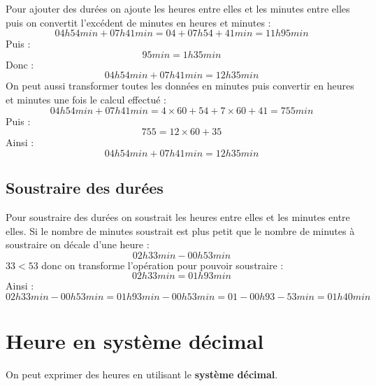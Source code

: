 \begin{pageCours}
\begin{Mt}
Pour ajouter des durées on ajoute les heures entre elles et les minutes entre elles puis on convertit l'excédent de minutes en heures et minutes :
\[04h54min+07h41min=04+07h54+41min=11h95min\]
Puis :
\[95min=1h35min\]
Donc :
\[04h54min+07h41min=12h35min\]
On peut aussi transformer toutes les données en minutes puis convertir en heures et minutes une fois le calcul effectué :
\[04h54min+07h41min=4\times60+54+7\times60+41
=755min\]
Puis :
\[755=12\times60+35\]
Ainsi :
\[04h54min+07h41min=12h35min\]
\end{Mt}



\subsection{Soustraire des durées}

\begin{Mt}
Pour soustraire des durées on soustrait les heures entre elles et les minutes entre elles. Si le nombre de minutes soustrait est plus petit que le nombre de minutes à soustraire on décale d'une heure :
\[
02h33min-00h53min
\]
$33<53$ donc on transforme l'opération pour pouvoir soustraire :
\[02h33min=01h93min\]
Ainsi :
\[
02h33min-00h53min=01h93min-00h53min
=01-00h93-53min=01h40min
\]
\end{Mt}



\section{Heure en système décimal}

\begin{Def}
On peut exprimer des heures en utilisant le \textbf{système décimal}.
\end{Def}


\end{pageCours}

